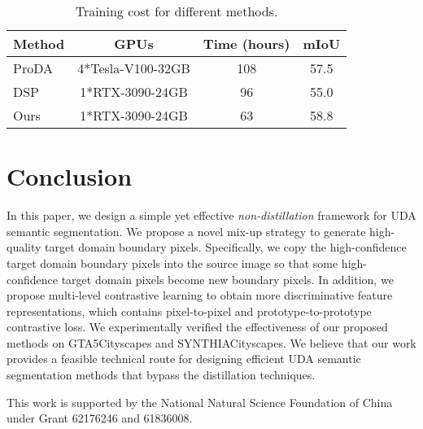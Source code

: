 \documentclass[sigconf]{acmart}
\begin{document}
	\begin{table}[h]
		\def\arraystretch{1.4}
		\setlength{\tabcolsep}{7pt}
		\begin{center}
			\caption{Training cost for different methods.}
			\vspace{0.5mm}
			\begin{tabular}{lccc} 
				\hline
				
				Method    & GPUs     &Time (hours) &mIoU  		\\ \toprule 
				ProDA 			& 4*Tesla-V100-32GB 	  &108 &57.5  	\\ \bottomrule
				DSP 			& 1*RTX-3090-24GB 	  &96 &55.0  	\\ \bottomrule
				Ours 			& 1*RTX-3090-24GB 	  &63 &58.8  	\\ \bottomrule
				
			\end{tabular}
			\vspace{0.5mm}
			\label{table:training_cost}
		\end{center}
		
	\end{table}


	\section{Conclusion}
	In this paper, we design a simple yet effective \emph{non-distillation} framework for UDA semantic segmentation. 
	We propose a novel mix-up strategy to generate high-quality target domain boundary pixels. Specifically, we copy the high-confidence target domain boundary pixels into the source image so that some high-confidence target domain pixels become new boundary pixels. In addition, we propose multi-level contrastive learning to obtain more discriminative feature representations, which contains pixel-to-pixel and prototype-to-prototype contrastive loss.
	We experimentally verified the effectiveness of our proposed methods on GTA5Cityscapes and SYNTHIACityscapes. 
	We believe that our work provides a feasible technical route for designing efficient UDA semantic segmentation methods that bypass the distillation techniques.
	
	
	
	
	
	
	
	
	








	
	
	
	
	
	
\begin{acks}
		This work is supported by the National Natural
		Science Foundation of China under Grant 62176246
		and 61836008.
	\end{acks}
	
\vfill\eject
	
	\balance
	
	


	
\end{document}
